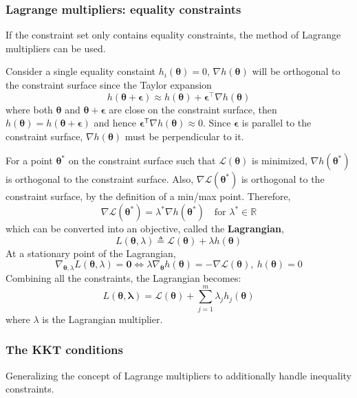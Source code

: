 \documentclass[11pt]{article}
\begin{document}
\subsubsection{Lagrange multipliers: equality constraints}
If the constraint set only contains equality constraints, the method of Lagrange multipliers can be used.

Consider a single equality constaint $h_i(\boldsymbol{\theta}) = 0$, $\nabla h(\boldsymbol{\theta})$ will be orthogonal to the constraint surface since the Taylor expansion
\[
h(\boldsymbol{\theta} + \boldsymbol{\epsilon}) \approx h(\boldsymbol{\theta}) + \boldsymbol{\epsilon}^\top \nabla h(\boldsymbol{\theta})
\]
where both $\boldsymbol{\theta}$ and $\boldsymbol{\theta} + \boldsymbol{\epsilon}$ are close on the constraint surface, then $h(\boldsymbol{\theta}) = h(\boldsymbol{\theta} + \boldsymbol{\epsilon})$ and hence $\boldsymbol{\epsilon}^{\mathsf{T}} \nabla h(\boldsymbol{\theta}) \approx 0$. Since $\boldsymbol{\epsilon}$ is parallel to the constraint surface, $\nabla h(\boldsymbol{\theta})$ must be perpendicular to it.

For a point $\boldsymbol{\theta}^*$ on the constraint surface such that $\mathcal{L}(\boldsymbol{\theta})$ is minimized, $\nabla h(\boldsymbol{\theta}^*)$ is orthogonal to the constraint surface. 
Also, $\nabla \mathcal{L}(\boldsymbol{\theta}^*)$ is orthogonal to the constraint surface, by the definition of a min/max point. 
Therefore,
\[
\nabla \mathcal{L}(\boldsymbol{\theta}^*) = \lambda^* \nabla h(\boldsymbol{\theta}^*) \quad \text{for} \, \, \lambda^* \in \mathbb{R}
\]
which can be converted into an objective, called the \textbf{Lagrangian},
\[
L(\boldsymbol{\theta}, \lambda) \triangleq \mathcal{L}(\boldsymbol{\theta}) + \lambda h(\boldsymbol{\theta})
\]
At a stationary point of the Lagrangian,
\[
\nabla_{\boldsymbol{\theta}, \lambda} L(\boldsymbol{\theta}, \lambda) = \mathbf{0} \iff \lambda \nabla_{\boldsymbol{\theta}} h(\boldsymbol{\theta}) = - \nabla \mathcal{L}(\boldsymbol{\theta}),\ h(\boldsymbol{\theta}) = 0
\]
Combining all the constraints, the Lagrangian becomes:
\[
L(\boldsymbol{\theta}, \boldsymbol{\lambda}) = \mathcal{L}(\boldsymbol{\theta}) + \sum_{j=1}^{m} \lambda_j h_j(\boldsymbol{\theta})
\]
where $\lambda$ is the Lagrangian multiplier.

\subsubsection{The KKT conditions}
Generalizing the concept of Lagrange multipliers to additionally handle inequality constraints.
\end{document}
